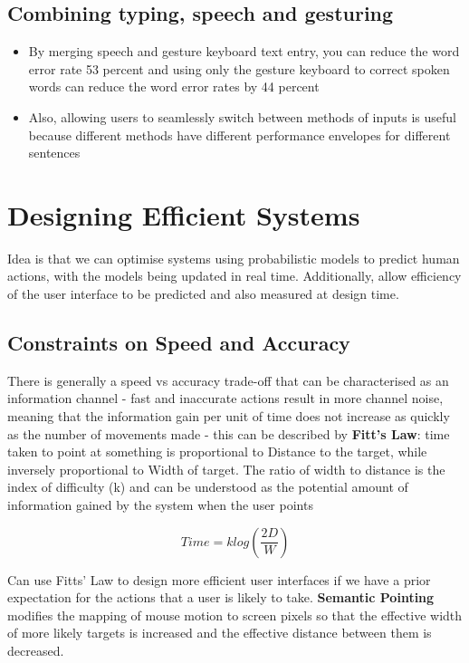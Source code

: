 \documentclass{article}
\begin{document}
\subsection{Combining typing, speech and gesturing}
\begin{itemize}
    \item By merging speech and gesture keyboard text entry, you can reduce the word error rate 53 percent and using only the gesture keyboard to correct spoken words can reduce the word error rates by 44 percent
    \item Also, allowing users to seamlessly switch between methods of inputs is useful because different methods have different performance envelopes for different sentences
\end{itemize}

\section{Designing Efficient Systems}
Idea is that we can optimise systems using probabilistic models to predict human actions, with the models being updated in real time. Additionally, allow efficiency of the user interface to be predicted and also measured at design time. 

\subsection{Constraints on Speed and Accuracy}
There is generally a speed vs accuracy trade-off that can be characterised as an information channel - fast and inaccurate actions result in more channel noise, meaning that the information gain per unit of time does not increase as quickly as the number of movements made - this can be described by \textbf{Fitt's Law}: time taken to point at something is proportional to Distance to the target, while inversely proportional to Width of target. The ratio of width to distance is the index of difficulty (k) and can be understood as the potential amount of information gained by the system when the user points

\begin{equation}
    Time = k log (\frac{2D}{W})
\end{equation}

Can use Fitts' Law to design more efficient user interfaces if we have a prior expectation for the actions that a user is likely to take. \textbf{Semantic Pointing} modifies the mapping of mouse motion to screen pixels so that the effective width of more likely targets is increased and the effective distance between them is decreased.
\end{document}

